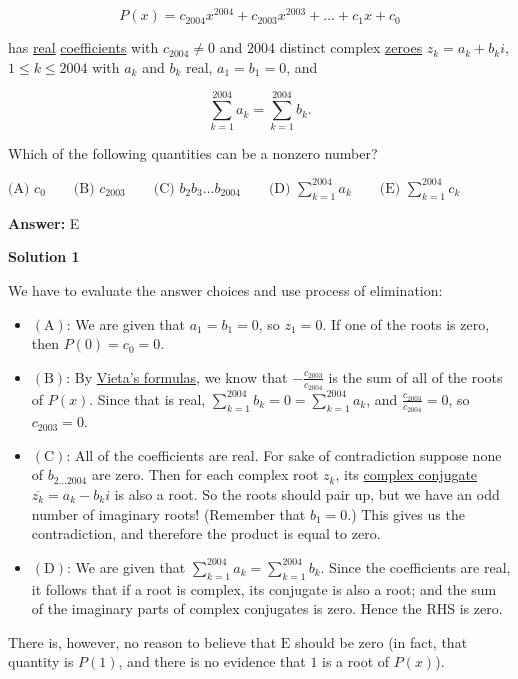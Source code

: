 \begin{enumerate}
 
 \[P(x) = c_{2004}x^{2004} + c_{2003}x^{2003} + ... + c_1x + c_0\]


 has \href{https://artofproblemsolving.com/wiki/index.php?title=Real}{real} \href{https://artofproblemsolving.com/wiki/index.php?title=Coefficient}{coefficients} with $c_{2004}\not = 0$ and $2004$ distinct complex \href{https://artofproblemsolving.com/wiki/index.php?title=Zero}{zeroes} $z_k = a_k + b_ki$, $1\leq k\leq 2004$ with $a_k$ and $b_k$ real, $a_1 = b_1 = 0$, and


 
 \[\sum_{k = 1}^{2004}{a_k} = \sum_{k = 1}^{2004}{b_k}.\]


 Which of the following quantities can be a nonzero number?


 $\text {(A) } c_0 \qquad \text {(B) } c_{2003} \qquad \text {(C) } b_2b_3...b_{2004} \qquad \text {(D) } \sum_{k = 1}^{2004}{a_k} \qquad \text {(E) }\sum_{k = 1}^{2004}{c_k}$

 \textbf{Answer: }E



\textbf{Solution 1}

We have to evaluate the answer choices and use process of elimination:

 
            \begin{itemize}
        \item $\mathrm{(A)}$: We are given that $a_1 = b_1 = 0$, so $z_1 = 0$. If one of the roots is zero, then $P(0) = c_0 = 0$.
        \item $\mathrm{(B)}$: By \href{https://artofproblemsolving.com/wiki/index.php?title=Vieta\%27s\_formulas}{Vieta's formulas}, we know that $-\frac{c_{2003}}{c_{2004}}$ is the sum of all of the roots of $P(x)$. Since that is real, $\sum_{k = 1}^{2004}{b_k}=0=\sum_{k = 1}^{2004}{a_k}$, and $\frac{c_{2003}}{c_{2004}}=0$, so $c_{2003}=0$.
        \item $\mathrm{(C)}$: All of the coefficients are real. For sake of contradiction suppose none of $b_{2\ldots 2004}$ are zero. Then for each complex root $z_k$, its \href{https://artofproblemsolving.com/wiki/index.php?title=Complex\_conjugate}{complex conjugate} $\overline{z_k} = a_k - b_k i$ is also a root. So the roots should pair up, but we have an odd number of imaginary roots! (Remember that $b_1 = 0$.) This gives us the contradiction, and therefore the product is equal to zero.
        \item $\mathrm{(D)}$: We are given that $\sum_{k = 1}^{2004}{a_k} = \sum_{k = 1}^{2004}{b_k}$. Since the coefficients are real, it follows that if a root is complex, its conjugate is also a root; and the sum of the imaginary parts of complex conjugates is zero. Hence the RHS is zero.
            \end{itemize}
            There is, however, no reason to believe that $\boxed{\mathrm{E}}$ should be zero (in fact, that quantity is $P(1)$, and there is no evidence that $1$ is a root of $P(x)$).


\end{enumerate}
